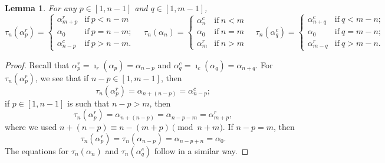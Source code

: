 \documentclass[11pt]{article}
\newtheorem{lemma}[theorem]{Lemma}%
\theoremstyle{definition}\newtheorem{definition}[theorem]{Definition}
\theoremstyle{definition}\newtheorem{remark}[theorem]{Remark}
\theoremstyle{remark}
\numberwithin{equation}{section}
\begin{document}
\begin{lemma}\label{l:taun_w0}
For any $p \in [1,n-1]$ and $q \in [1,m-1]$,
\begin{equation}\label{eq:taun_w0}
    \tau_n(\alpha_p^r) = 
    \begin{cases}
        \alpha_{m+p}^r &\text{if} \  p < n-m\\
        \alpha_0 &\text{if} \ p = n-m;\\
        \alpha_{n-p}^c &\text{if} \ p > n - m.
    \end{cases} 
    \quad 
    \tau_n(\alpha_n) = 
    \begin{cases}
        \alpha_n^c &\text{if} \  n < m \\
        \alpha_0 &\text{if} \  n = m \\
        \alpha_m^r &\text{if} \  n > m
    \end{cases}
    \quad
    \tau_n(\alpha_q^c) = 
    \begin{cases}
    \alpha_{n+q}^c &\text{if} \ q <m-n;\\
    \alpha_0 &\text{if} \ q = m-n;\\
    \alpha_{m-q}^r &\text{if} \ q > m-n.
    \end{cases}
\end{equation}

\end{lemma}
\begin{proof}
Recall that $\alpha_p^r = \imath_r(\alpha_p)= \alpha_{n-p} $ and $\alpha_q^c = \imath_c(\alpha_q) = \alpha_{n+q}$. For $\tau_n(\alpha_p^r)$, we see that if $n-p \in [1,m-1]$, then
\begin{equation*}
    \tau_n(\alpha_p^r) = \alpha_{n+(n-p)} = \alpha_{n-p}^c;
\end{equation*}
if $p \in [1,n-1]$ is such that $n-p > m$, then
\begin{equation*}
    \tau_n(\alpha_p^r) = \alpha_{n+(n-p)} = \alpha_{n-p-m} = \alpha_{m+p}^r,
\end{equation*}
where we used $n+(n-p) \equiv n-(m+p) \pmod{n+m}$. If $n-p = m$, then
\begin{equation*}
    \tau_n(\alpha_p^r) = \tau_n(\alpha_{n-p}) = \alpha_{n-p+n} = \alpha_0.
\end{equation*}
The equations for $\tau_n(\alpha_n)$ and $\tau_n(\alpha_q^c)$ follow in a similar way.
\end{proof}
\end{document}
